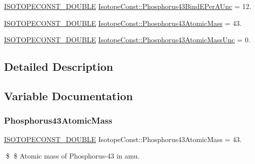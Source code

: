 \begin{DoxyCompactItemize}
\mbox{\hyperlink{group___isotope_const-_macros_ga8f45a7272ce02c0b4c65c44636ed719a}{I\+S\+O\+T\+O\+P\+E\+C\+O\+N\+S\+T\+\_\+\+D\+O\+U\+B\+LE}} \mbox{\hyperlink{group___isotope_const-_phosphorus-_p43_ga454257086359b0778d6ff1012fdf2665}{Isotope\+Const\+::\+Phosphorus43\+Bind\+E\+Per\+A\+Unc}} = 12.
\item 
\mbox{\hyperlink{group___isotope_const-_macros_ga8f45a7272ce02c0b4c65c44636ed719a}{I\+S\+O\+T\+O\+P\+E\+C\+O\+N\+S\+T\+\_\+\+D\+O\+U\+B\+LE}} \mbox{\hyperlink{group___isotope_const-_phosphorus-_p43_ga313dcd0f5483c0a10d7d59c1a5c07f57}{Isotope\+Const\+::\+Phosphorus43\+Atomic\+Mass}} = 43.
\item 
\mbox{\hyperlink{group___isotope_const-_macros_ga8f45a7272ce02c0b4c65c44636ed719a}{I\+S\+O\+T\+O\+P\+E\+C\+O\+N\+S\+T\+\_\+\+D\+O\+U\+B\+LE}} \mbox{\hyperlink{group___isotope_const-_phosphorus-_p43_gaf5989df1716c57b239b092745e247a1c}{Isotope\+Const\+::\+Phosphorus43\+Atomic\+Mass\+Unc}} = 0.
\end{DoxyCompactItemize}


\subsection{Detailed Description}


\subsection{Variable Documentation}
\mbox{\label{group___isotope_const-_phosphorus-_p43_ga313dcd0f5483c0a10d7d59c1a5c07f57}} 
\subsubsection{\texorpdfstring{Phosphorus43\+Atomic\+Mass}{Phosphorus43AtomicMass}}
{\footnotesize\ttfamily \mbox{\hyperlink{group___isotope_const-_macros_ga8f45a7272ce02c0b4c65c44636ed719a}{I\+S\+O\+T\+O\+P\+E\+C\+O\+N\+S\+T\+\_\+\+D\+O\+U\+B\+LE}} Isotope\+Const\+::\+Phosphorus43\+Atomic\+Mass = 43.}

\$ \$ Atomic mass of Phosphorus-\/43 in amu. \mbox{\label{group___isotope_const-_phosphorus-_p43_gaf5989df1716c57b239b092745e247a1c}} 
